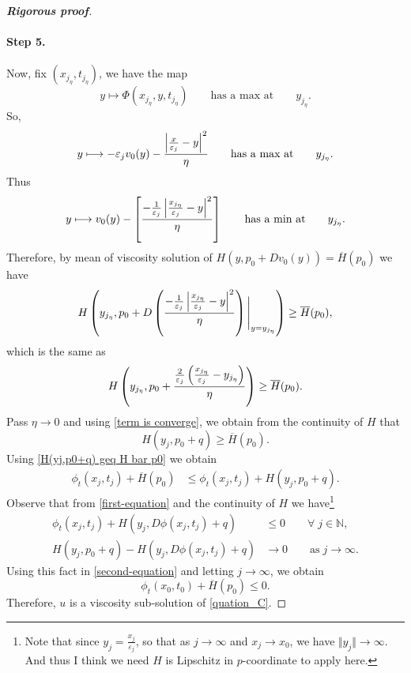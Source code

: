 \documentclass[12pt, oneside]{amsart}  	%
\begin{document}
\begin{proof}[\textbf{Rigorous proof}]
\paragraph{\textbf{Step 5.}}	 Now, fix $(x_{j_\eta}, t_{j_\eta})$, we have the map
\begin{equation*}
y\longmapsto \Phi(x_{j_\eta}, y, t_{j_\eta})\qquad\text{has a max at}\qquad y_{j_\eta}.
\end{equation*}
So,
\begin{equation*}
y\longmapsto -\varepsilon_j v_0(y) - \frac{\left|\frac{x}{\varepsilon_j} - y\right|^2}{\eta}\qquad\text{has a max at}\qquad y_{j_\eta}.
\end{equation*}
Thus
\begin{equation*}
y\longmapsto  v_0(y) - \left[\frac{-\frac{1}{\varepsilon_j}\left|\frac{x_{j_\eta}}{\varepsilon_j} - y\right|^2}{\eta}\right]\qquad\text{has a min at}\qquad y_{j_\eta}.
\end{equation*}
Therefore, by mean of viscosity solution of $H(y,p_0+Dv_0(y)) = \overline{H}(p_0)$ we have
\begin{equation*}
H\left(y_{j_\eta}, p_0 + D\left(\frac{ -\frac{1}{\varepsilon_j} \left|\frac{x_{j_\eta}}{\varepsilon_j} - y\right|^2}{\eta}\right)\Bigg|_{y = y_{j_\eta}}\right) \geq \overline{H}(p_0),
\end{equation*}
which is the same as
\begin{equation*}
 H\left(y_{j_\eta}, p_0 +\frac{\frac{2}{\varepsilon_j}\left(\frac{x_{j_\eta}}{\varepsilon_j} - y_{j_\eta}\right)}{\eta} \right) \geq \overline{H}(p_0).
\end{equation*}
Pass $\eta \longrightarrow 0$ and using \eqref{term is converge}, we obtain from the continuity of $H$ that
\begin{equation}\label{H(yj,p0+q) geq H bar p0}
H\left(y_j, p_0+ q\right)\geq \overline{H}(p_0).
\end{equation}
Using \eqref{H(yj,p0+q) geq H bar p0} we obtain %
\begin{align}\label{second-equation}
\phi_t\left(x_j,t_j\right) + \overline{H}(p_0) &\leq \phi_t\left(x_j,t_j\right) + H\left(y_j,p_0 + q\right).
\end{align}
Observe that from \eqref{first-equation} and the continuity of $H$ we have\footnote{Note that since $y_j = \frac{x_j}{\varepsilon_j}$, so that as $j\longrightarrow\infty$ and $x_j\longrightarrow x_0$, we have $\Vert y_j\Vert\longrightarrow \infty$. And thus I think we need $H$ is Lipschitz in $p$-coordinate to apply here.}
\begin{align*}
\phi_t(x_j,t_j) + H(y_j,D\phi(x_j,t_j) + q) &\leq 0 \qquad\forall\; j\in \mathbb{N},\\
H\left(y_j,p_0 + q\right) - H(y_j,D\phi(x_j,t_j) + q) &\longrightarrow 0 \qquad\text{as}\;j\longrightarrow\infty.
\end{align*}
Using this fact in \eqref{second-equation} and letting $j\longrightarrow \infty$, we obtain
\begin{equation*}
\phi_t(x_0,t_0) + \overline{H}(p_0) \leq 0.
\end{equation*}
Therefore, $u$ is a viscosity sub-solution of \eqref{quation_C}.
\end{proof}
\end{document}
